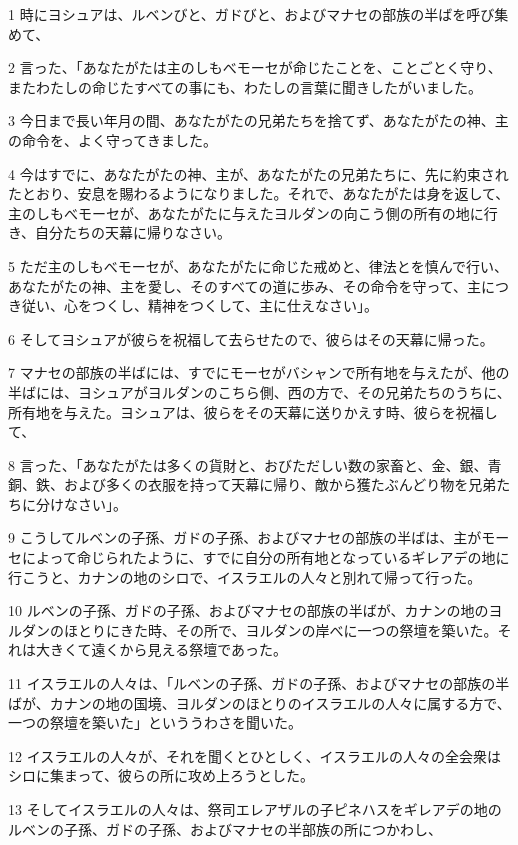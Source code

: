 \par 1 時にヨシュアは、ルベンびと、ガドびと、およびマナセの部族の半ばを呼び集めて、
\par 2 言った、「あなたがたは主のしもべモーセが命じたことを、ことごとく守り、またわたしの命じたすべての事にも、わたしの言葉に聞きしたがいました。
\par 3 今日まで長い年月の間、あなたがたの兄弟たちを捨てず、あなたがたの神、主の命令を、よく守ってきました。
\par 4 今はすでに、あなたがたの神、主が、あなたがたの兄弟たちに、先に約束されたとおり、安息を賜わるようになりました。それで、あなたがたは身を返して、主のしもべモーセが、あなたがたに与えたヨルダンの向こう側の所有の地に行き、自分たちの天幕に帰りなさい。
\par 5 ただ主のしもべモーセが、あなたがたに命じた戒めと、律法とを慎んで行い、あなたがたの神、主を愛し、そのすべての道に歩み、その命令を守って、主につき従い、心をつくし、精神をつくして、主に仕えなさい」。
\par 6 そしてヨシュアが彼らを祝福して去らせたので、彼らはその天幕に帰った。
\par 7 マナセの部族の半ばには、すでにモーセがバシャンで所有地を与えたが、他の半ばには、ヨシュアがヨルダンのこちら側、西の方で、その兄弟たちのうちに、所有地を与えた。ヨシュアは、彼らをその天幕に送りかえす時、彼らを祝福して、
\par 8 言った、「あなたがたは多くの貨財と、おびただしい数の家畜と、金、銀、青銅、鉄、および多くの衣服を持って天幕に帰り、敵から獲たぶんどり物を兄弟たちに分けなさい」。
\par 9 こうしてルベンの子孫、ガドの子孫、およびマナセの部族の半ばは、主がモーセによって命じられたように、すでに自分の所有地となっているギレアデの地に行こうと、カナンの地のシロで、イスラエルの人々と別れて帰って行った。
\par 10 ルベンの子孫、ガドの子孫、およびマナセの部族の半ばが、カナンの地のヨルダンのほとりにきた時、その所で、ヨルダンの岸べに一つの祭壇を築いた。それは大きくて遠くから見える祭壇であった。
\par 11 イスラエルの人々は、「ルベンの子孫、ガドの子孫、およびマナセの部族の半ばが、カナンの地の国境、ヨルダンのほとりのイスラエルの人々に属する方で、一つの祭壇を築いた」といううわさを聞いた。
\par 12 イスラエルの人々が、それを聞くとひとしく、イスラエルの人々の全会衆はシロに集まって、彼らの所に攻め上ろうとした。
\par 13 そしてイスラエルの人々は、祭司エレアザルの子ピネハスをギレアデの地のルベンの子孫、ガドの子孫、およびマナセの半部族の所につかわし、
